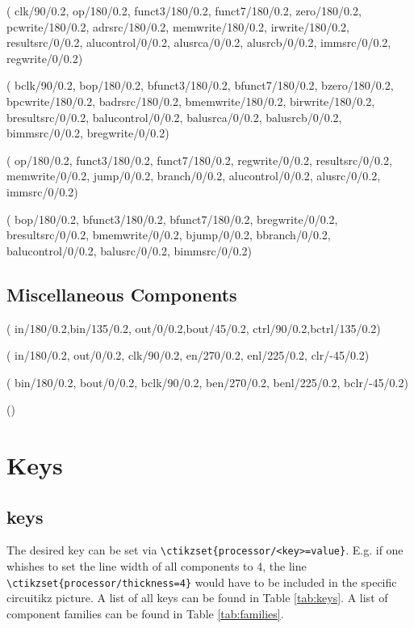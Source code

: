 \documentclass[.52pt,a4paper,titlepage]{article}
\begin{document}
(
clk/90/0.2,
op/180/0.2,
funct3/180/0.2,
funct7/180/0.2,
zero/180/0.2,
pcwrite/180/0.2,
adrsrc/180/0.2,
memwrite/180/0.2,
irwrite/180/0.2,
resultsrc/0/0.2,
alucontrol/0/0.2,
alusrca/0/0.2,
alusrcb/0/0.2,
immsrc/0/0.2,
regwrite/0/0.2)

(
bclk/90/0.2,
bop/180/0.2,
bfunct3/180/0.2,
bfunct7/180/0.2,
bzero/180/0.2,
bpcwrite/180/0.2,
badrsrc/180/0.2,
bmemwrite/180/0.2,
birwrite/180/0.2,
bresultsrc/0/0.2,
balucontrol/0/0.2,
balusrca/0/0.2,
balusrcb/0/0.2,
bimmsrc/0/0.2,
bregwrite/0/0.2)

(
op/180/0.2,
funct3/180/0.2,
funct7/180/0.2,
regwrite/0/0.2,
resultsrc/0/0.2,
memwrite/0/0.2,
jump/0/0.2,
branch/0/0.2,
alucontrol/0/0.2,
alusrc/0/0.2,
immsrc/0/0.2)

(
bop/180/0.2,
bfunct3/180/0.2,
bfunct7/180/0.2,
bregwrite/0/0.2,
bresultsrc/0/0.2,
bmemwrite/0/0.2,
bjump/0/0.2,
bbranch/0/0.2,
balucontrol/0/0.2,
balusrc/0/0.2,
bimmsrc/0/0.2)

\subsection{Miscellaneous Components}
(
in/180/0.2,bin/135/0.2,
out/0/0.2,bout/45/0.2,
ctrl/90/0.2,bctrl/135/0.2)

(
in/180/0.2,
out/0/0.2,
clk/90/0.2, 
en/270/0.2,
enl/225/0.2,
clr/-45/0.2)

(
bin/180/0.2,
bout/0/0.2,
bclk/90/0.2, 
ben/270/0.2,
benl/225/0.2,
bclr/-45/0.2)

()


\section{Keys}
\subsection{\Circuitikz{} keys}
The desired \Circuitikz{} key can be set via \verb|\ctikzset{processor/<key>=value}|. E.g. if one whishes to set the line width of all components to 4, the line  \verb|\ctikzset{processor/thickness=4}| would have to be included in the specific circuitikz picture. A list of all \Circuitikz{} keys can be found in Table \ref{tab:keys}. A list of component families can be found in Table \ref{tab:families}.
\end{document}
